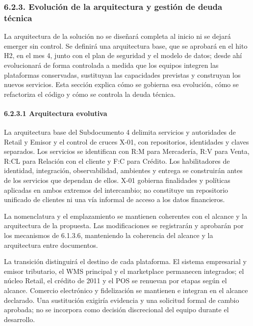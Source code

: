\documentclass[11pt]{article}
\begin{document}
\subsubsection{6.2.3. Evolución de la arquitectura y gestión de deuda técnica}\label{6-2-3-evolucion-de-la-arquitectura-y-gestion-de-deuda-tecnica}

La arquitectura de la solución no se diseñará completa al inicio ni se dejará emerger sin control. Se definirá una arquitectura base, que se aprobará en el hito H2, en el mes 4, junto con el plan de seguridad y el modelo de datos; desde ahí evolucionará de forma controlada a medida que los equipos integren las plataformas conservadas, sustituyan las capacidades previstas y construyan los nuevos servicios. Esta sección explica cómo se gobierna esa evolución, cómo se refactoriza el código y cómo se controla la deuda técnica.

\paragraph{6.2.3.1 Arquitectura evolutiva}\label{6-2-3-1-arquitectura-evolutiva}

La arquitectura base del Subdocumento 4 delimita servicios y autoridades de Retail y Emisor y el control de cruces X-01, con repositorios, identidades y claves separados. Los servicios se identifican con R:M para Mercadería, R:V para Venta, R:CL para Relación con el cliente y F:C para Crédito. Los habilitadores de identidad, integración, observabilidad, ambientes y entrega se construirán antes de los servicios que dependan de ellos. X-01 gobierna finalidades y políticas aplicadas en ambos extremos del intercambio; no constituye un repositorio unificado de clientes ni una vía informal de acceso a los datos financieros.

La nomenclatura y el emplazamiento se mantienen coherentes con el
alcance y la arquitectura de la propuesta. Las modificaciones se
registrarán y aprobarán por los mecanismos de 6.1.3.6, manteniendo la
coherencia del alcance y la arquitectura entre documentos.

La transición distinguirá el destino de cada plataforma. El sistema
empresarial y emisor tributario, el WMS principal y el marketplace
permanecen integrados; el núcleo Retail, el crédito de 2011 y el POS se
renuevan por etapas según el alcance. Comercio electrónico y
fidelización se mantienen e integran en el alcance declarado. Una
sustitución exigiría evidencia y una solicitud formal de cambio
aprobada; no se incorpora como decisión discrecional del equipo durante
el desarrollo.
\end{document}
